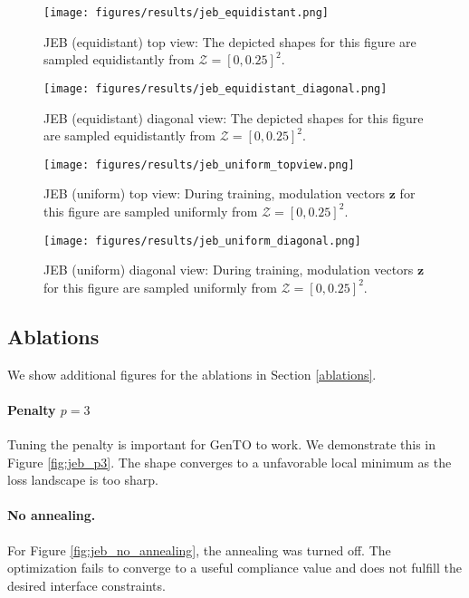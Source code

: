 \begin{figure}
    \centering
    \texttt{[image: figures/results/jeb\_equidistant.png]}
    \caption{JEB (equidistant) top view:
    The depicted shapes for this figure are sampled equidistantly from $\mathcal{Z} = [0,0.25]^2$.}
    \label{fig:jeb_equi_top}
\end{figure}

\begin{figure}
    \centering
    \texttt{[image: figures/results/jeb\_equidistant\_diagonal.png]}
    \caption{JEB (equidistant) diagonal view: The depicted shapes for this figure are sampled equidistantly from $\mathcal{Z} = [0,0.25]^2$.}
    \label{fig:jeb_equi_diag}
\end{figure}

\begin{figure}
    \centering
    \texttt{[image: figures/results/jeb\_uniform\_topview.png]}
    \caption{JEB (uniform) top view:
    During training, modulation vectors $\mathbf{z}$ for this figure are sampled uniformly from $\mathcal{Z} = [0,0.25]^2$.}
    \label{fig:jeb_uniform_top}
\end{figure}

\begin{figure}
    \centering
    \texttt{[image: figures/results/jeb\_uniform\_diagonal.png]}
    \caption{JEB (uniform) diagonal view:
    During training, modulation vectors $\mathbf{z}$ for this figure are sampled uniformly from $\mathcal{Z} = [0,0.25]^2$.}
    \label{fig:jeb_uniform_diag}
\end{figure}

\subsection{Ablations}
\label{app:ablations}
We show additional figures for the ablations in Section \ref{ablations}.


\paragraph{Penalty $p=3$}
Tuning the penalty is important for GenTO to work.
We demonstrate this in Figure \ref{fig:jeb_p3}.
The shape converges to a unfavorable local minimum as the loss landscape is too sharp.

\paragraph{No annealing.}
For Figure \ref{fig:jeb_no_annealing}, the annealing was turned off.
The optimization fails to converge to a useful compliance value and does not fulfill the desired interface constraints.



